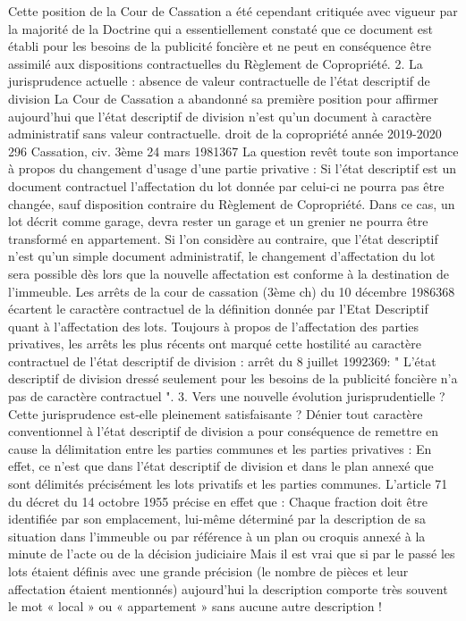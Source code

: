 		Cette position de la Cour de Cassation a été cependant critiquée avec vigueur par la majorité de la Doctrine qui a essentiellement constaté que ce document est établi pour les besoins de la publicité foncière et ne peut en conséquence être assimilé aux dispositions contractuelles du Règlement de Copropriété.
		2. La jurisprudence actuelle : absence de valeur contractuelle de l’état descriptif de division
		La Cour de Cassation a abandonné sa première position pour affirmer aujourd'hui que l’état descriptif de division n'est qu'un document à caractère administratif sans valeur contractuelle.
		droit de la copropriété année 2019-2020
		296
		Cassation, civ. 3ème 24 mars 1981367
		La question revêt toute son importance à propos du changement d'usage d'une partie privative : Si l'état descriptif est un document contractuel l'affectation du lot donnée par celui-ci ne pourra pas être changée, sauf disposition contraire du Règlement de Copropriété. Dans ce cas, un lot décrit comme garage, devra rester un garage et un grenier ne pourra être transformé en appartement.
		Si l'on considère au contraire, que l'état descriptif n'est qu'un simple document administratif, le changement d'affectation du lot sera possible dès lors que la nouvelle affectation est conforme à la destination de l'immeuble.
		Les arrêts de la cour de cassation (3ème ch) du 10 décembre 1986368 écartent le caractère contractuel de la définition donnée par l'Etat Descriptif quant à l'affectation des lots.
		Toujours à propos de l'affectation des parties privatives, les arrêts les plus récents ont marqué cette hostilité au caractère contractuel de l’état descriptif de division : arrêt du 8 juillet 1992369:
		" L'état descriptif de division dressé seulement pour les besoins de la publicité foncière n'a pas de caractère contractuel ".
		3. Vers une nouvelle évolution jurisprudentielle ?
		Cette jurisprudence est-elle pleinement satisfaisante ? Dénier tout caractère conventionnel à l’état descriptif de division a pour conséquence de remettre en cause la délimitation entre les parties communes et les parties privatives :
		En effet, ce n’est que dans l’état descriptif de division et dans le plan annexé que sont délimités précisément les lots privatifs et les parties communes. L’article 71 du décret du 14 octobre 1955 précise en effet que :
		Chaque fraction doit être identifiée par son emplacement, lui-même déterminé par la description de sa situation dans l'immeuble ou par référence à un plan ou croquis annexé à la minute de l'acte ou de la décision judiciaire
		Mais il est vrai que si par le passé les lots étaient définis avec une grande précision (le nombre de pièces et leur affectation étaient mentionnés) aujourd’hui la description comporte très souvent le mot « local » ou « appartement » sans aucune autre description !
